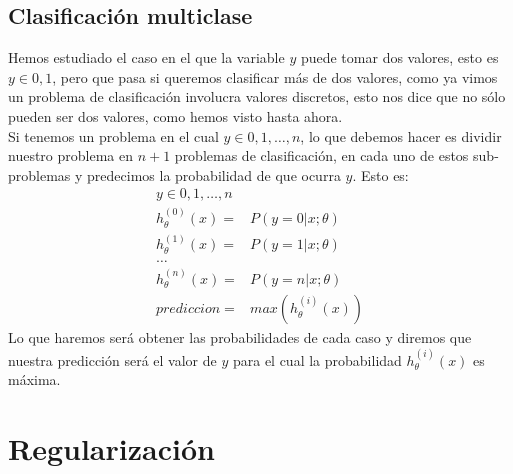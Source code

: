 \documentclass{report}
\begin{document}
\section{Clasificación multiclase}
Hemos estudiado el caso en el que la variable $ y $ puede tomar dos valores, esto es $ y\in{0,1} $, pero que pasa si queremos clasificar más de dos valores, como ya vimos un problema de clasificación involucra valores discretos, esto nos dice que no sólo pueden ser dos valores, como hemos visto hasta ahora.\\Si tenemos un problema en el cual $ y\in{0,1,\dots,n} $, lo que debemos hacer es dividir nuestro problema en $ n+1 $ problemas de clasificación, en cada uno de estos sub-problemas y predecimos la probabilidad de que ocurra $ y $. Esto es:
\begin{align*}
	y\in{0,1,\dots,n}\\
	h_\theta^{(0)}(x)=&P(y=0|x;\theta)\\
	h_\theta^{(1)}(x)=&P(y=1|x;\theta)\\
	\dots\\
	h_\theta^{(n)}(x)=&P(y=n|x;\theta)\\
	prediccion=&max(h_\theta^{(i)}(x))	
\end{align*}
Lo que haremos será obtener las probabilidades de cada caso y diremos que nuestra predicción será el valor de $ y $ para el cual la probabilidad $ h_\theta^{(i)}(x) $ es máxima.
\chapter{Regularización}
\end{document}

